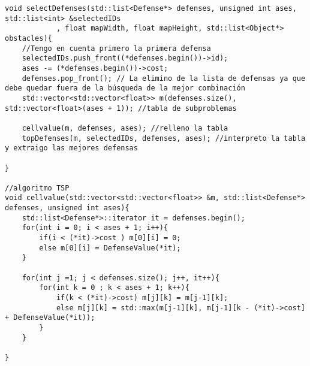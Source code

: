 \begin{lstlisting}
void selectDefenses(std::list<Defense*> defenses, unsigned int ases, std::list<int> &selectedIDs
            , float mapWidth, float mapHeight, std::list<Object*> obstacles){
    //Tengo en cuenta primero la primera defensa
    selectedIDs.push_front((*defenses.begin())->id);
    ases -= (*defenses.begin())->cost;
    defenses.pop_front(); // La elimino de la lista de defensas ya que debe quedar fuera de la búsqueda de la mejor combinación
    std::vector<std::vector<float>> m(defenses.size(), std::vector<float>(ases + 1)); //tabla de subproblemas
    
    cellvalue(m, defenses, ases); //relleno la tabla
    topDefenses(m, selectedIDs, defenses, ases); //interpreto la tabla y extraigo las mejores defensas

}

//algoritmo TSP
void cellvalue(std::vector<std::vector<float>> &m, std::list<Defense*> defenses, unsigned int ases){
    std::list<Defense*>::iterator it = defenses.begin();
    for(int i = 0; i < ases + 1; i++){
        if(i < (*it)->cost ) m[0][i] = 0;
        else m[0][i] = DefenseValue(*it);
    }

    for(int j =1; j < defenses.size(); j++, it++){
        for(int k = 0 ; k < ases + 1; k++){
            if(k < (*it)->cost) m[j][k] = m[j-1][k];
            else m[j][k] = std::max(m[j-1][k], m[j-1][k - (*it)->cost] + DefenseValue(*it));
        }
    }

}


\end{lstlisting}